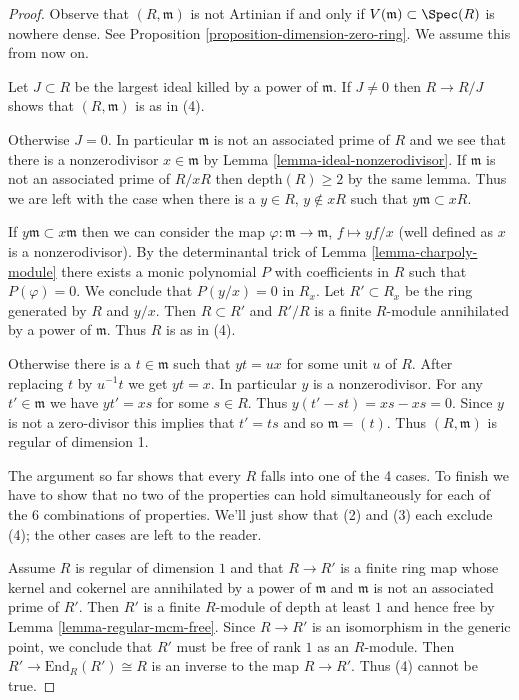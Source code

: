 \begin{proof}
Observe that $(R, \mathfrak m)$ is not Artinian if and only if
$V(\mathfrak m) \subset \Spec(R)$ is nowhere dense. See
Proposition \ref{proposition-dimension-zero-ring}. We assume this from now on.

\medskip\noindent
Let $J \subset R$ be the largest ideal killed by a power of $\mathfrak m$.
If $J \not = 0$ then $R \to R/J$ shows that $(R, \mathfrak m)$
is as in (4).

\medskip\noindent
Otherwise $J = 0$. In particular $\mathfrak m$ is not an associated prime
of $R$ and we see that there is a nonzerodivisor $x \in \mathfrak m$ by
Lemma \ref{lemma-ideal-nonzerodivisor}. If $\mathfrak m$
is not an associated prime of $R/xR$ then $\text{depth}(R) \geq 2$
by the same lemma. Thus we are left with the case when there is a
$y \in R$, $y \not \in xR$ such that $y \mathfrak m \subset xR$.

\medskip\noindent
If $y \mathfrak m \subset x \mathfrak m$ then we can consider the
map $\varphi : \mathfrak m \to \mathfrak m$, $f \mapsto yf/x$
(well defined as $x$ is a nonzerodivisor). By the determinantal trick
of Lemma \ref{lemma-charpoly-module} there exists a monic
polynomial $P$ with coefficients in $R$ such that $P(\varphi) = 0$.
We conclude that $P(y/x) = 0$ in $R_x$.
Let $R' \subset R_x$ be the ring generated by
$R$ and $y/x$. Then $R \subset R'$ and $R'/R$ is a finite $R$-module
annihilated by a power of $\mathfrak m$. Thus $R$ is as in (4).

\medskip\noindent
Otherwise there is a $t \in \mathfrak m$ such that $y t = u x$
for some unit $u$ of $R$. After replacing $t$ by $u^{-1}t$
we get $yt = x$. In particular $y$ is a nonzerodivisor.
For any $t' \in \mathfrak m$ we have $y t' = x s$ for some $s \in R$.
Thus $y (t' - s t ) = x s - x s = 0$.
Since $y$ is not a zero-divisor this implies that $t' = ts$ and so
$\mathfrak m = (t)$. Thus $(R, \mathfrak m)$ is regular of dimension 1.

\medskip\noindent
The argument so far shows that every $R$ falls into one of the 4 cases.
To finish we have to show that no two of the properties can hold
simultaneously for each of the 6 combinations of properties. We'll
just show that (2) and (3) each exclude (4); the other cases are left
to the reader.

\medskip\noindent
Assume $R$ is regular of dimension $1$ and that $R \to R'$ is a finite
ring map whose kernel and cokernel are annihilated by a power of $\mathfrak m$
and $\mathfrak m$ is not an associated prime of $R'$. Then $R'$
is a finite $R$-module of depth at least $1$ and hence free by
Lemma \ref{lemma-regular-mcm-free}. Since $R \to R'$ is an isomorphism
in the generic point, we conclude that $R'$ must be free of rank $1$
as an $R$-module. Then $R' \to \text{End}_R(R') \cong R$ is an inverse
to the map $R \to R'$. Thus (4) cannot be true.


\end{proof}
